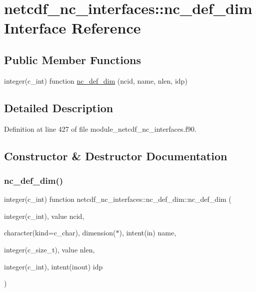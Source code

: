 \hypertarget{interfacenetcdf__nc__interfaces_1_1nc__def__dim}{}\section{netcdf\+\_\+nc\+\_\+interfaces\+:\+:nc\+\_\+def\+\_\+dim Interface Reference}
\label{interfacenetcdf__nc__interfaces_1_1nc__def__dim}
\subsection*{Public Member Functions}
\begin{DoxyCompactItemize}
\item 
integer(c\+\_\+int) function \hyperlink{interfacenetcdf__nc__interfaces_1_1nc__def__dim_a9f1ed98efd09e968d982116757cadfce}{nc\+\_\+def\+\_\+dim} (ncid, name, nlen, idp)
\end{DoxyCompactItemize}


\subsection{Detailed Description}


Definition at line 427 of file module\+\_\+netcdf\+\_\+nc\+\_\+interfaces.\+f90.



\subsection{Constructor \& Destructor Documentation}
\mbox{\label{interfacenetcdf__nc__interfaces_1_1nc__def__dim_a9f1ed98efd09e968d982116757cadfce}} 
\subsubsection{\texorpdfstring{nc\+\_\+def\+\_\+dim()}{nc\_def\_dim()}}
{\footnotesize\ttfamily integer(c\+\_\+int) function netcdf\+\_\+nc\+\_\+interfaces\+::nc\+\_\+def\+\_\+dim\+::nc\+\_\+def\+\_\+dim (\begin{DoxyParamCaption}\item[{integer(c\+\_\+int), value}]{ncid,  }\item[{character(kind=c\+\_\+char), dimension($\ast$), intent(in)}]{name,  }\item[{integer(c\+\_\+size\+\_\+t), value}]{nlen,  }\item[{integer(c\+\_\+int), intent(inout)}]{idp }\end{DoxyParamCaption})}



